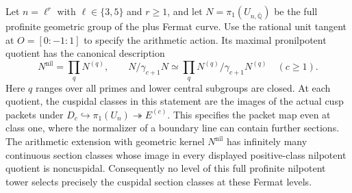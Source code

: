 \begin{theorem}
\label{E-full-pronilpotent}
Let $n=\ell^r$ with $\ell\in\{3,5\}$ and $r\ge1$, and let
$N=\pi_1(U_{n,\overline{\mathbb Q}})$ be the full profinite
geometric group of the plus Fermat curve. Use the rational
unit tangent at $O=[0:-1:1]$ to specify the arithmetic action.
Its maximal pronilpotent quotient has the canonical description
\[
 N^{\mathrm{nil}}=\prod_q N^{(q)},
 \qquad
 N/\gamma_{c+1}N\simeq
       \prod_q N^{(q)}/\gamma_{c+1}N^{(q)}\quad(c\ge1).
 \tag{E.32.1}
\]
Here $q$ ranges over all primes and lower central subgroups
are closed. At each quotient, the cuspidal classes in this
statement are the images of the actual cusp packets under
$D_c\hookrightarrow\pi_1(U_n)\twoheadrightarrow
E^{(c)}$. This specifies the packet map even at class one,
where the normalizer of a boundary line can contain further
sections. The arithmetic extension with geometric kernel
$N^{\mathrm{nil}}$ has infinitely many continuous section
classes whose image in every displayed positive-class
nilpotent quotient is noncuspidal. Consequently no level of
this full profinite nilpotent tower selects precisely the
cuspidal section classes at these Fermat levels.
\end{theorem}
